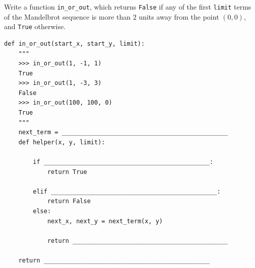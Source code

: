 \begin{blocksection}
\question Write a function \lstinline{in_or_out}, which returns \lstinline{False} if any of the first \lstinline{limit} terms of the Mandelbrot sequence is more than $2$ units away from the point $(0, 0)$, and \lstinline{True} otherwise. 
\begin{lstlisting}
def in_or_out(start_x, start_y, limit):
    """
    >>> in_or_out(1, -1, 1)
    True
    >>> in_or_out(1, -3, 3)
    False
    >>> in_or_out(100, 100, 0)
    True
    """
    next_term = ______________________________________________
    def helper(x, y, limit):

        if ______________________________________________:
            return True

        elif ______________________________________________: 
            return False
        else: 
            next_x, next_y = next_term(x, y)

            return ___________________________________________
            
    return ______________________________________________
\end{lstlisting}
\end{blocksection}
